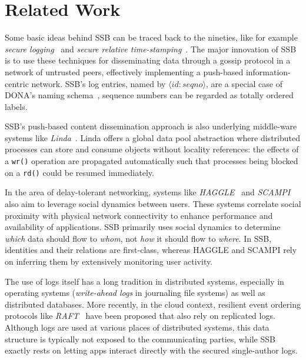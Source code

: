 \documentclass[9pt,sigconf,rewiew]{acmart}
\begin{document}
\section{Related Work}
\label{sect:relwork}

Some basic ideas behind SSB can be traced back to the nineties, like
for example {\em secure logging}~\cite{schneier1998cryptographic} and {\em secure
relative time-stamping}~\cite{haber1990time}. The major innovation of
SSB is to use these techniques for disseminating data through a gossip
protocol in a network of untrusted peers, effectively implementing a
push-based information-centric network. SSB's log entries, named by $\langle id:seqno\rangle$, are a special case of DONA's naming schema~\cite{Koponen:2007:DNA:1282380.1282402}, sequence numbers can be regarded as totally ordered labels.

SSB's push-based content dissemination approach is also
underlying middle-ware systems like
{\em Linda}~\cite{Gelernter:1985:GCL:2363.2433}. Linda offers a global data
pool abstraction where distributed processes can store and consume
objects without locality references: the effects of a {\tt wr()}
operation are propagated automatically such that processes being
blocked on a {\tt rd()} could be resumed immediately.

In the area of delay-tolerant networking, systems like {\em HAGGLE}~\cite{scott2006haggle} and {\em SCAMPI}~\cite{pitkanen2012scampi} also aim to leverage social dynamics between users. These systems correlate social proximity with physical network connectivity to enhance performance and availability of applications. SSB primarily uses social dynamics to determine {\em which} data should flow to {\em whom}, not {\em how} it should flow to {\em where}. In SSB, identities and their relations are first-class, whereas HAGGLE and SCAMPI rely on inferring them by extensively monitoring user activity.

The use of logs itself has a long tradition in distributed systems,
especially in operating systems ({\em write-ahead logs} in journaling file
systems) as well as distributed databases. More recently, in the cloud
context, resilient event ordering protocols like
{\em RAFT}~\cite{DBLP:conf/usenix/OngaroO14} have been proposed that also
rely on replicated logs. Although logs are used at various places of
distributed systems, this data structure is typically not exposed to
the communicating parties, while SSB exactly rests on letting apps
interact directly with the secured single-author logs.
\end{document}
